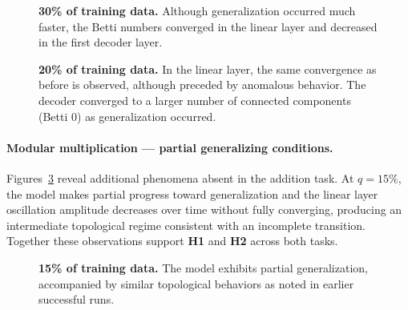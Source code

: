 \begin{figure}[htbp]
    \centering
    \hfill
    
    \caption[30\% of training data (Modular Product).]{\textbf{30\% of training data.} Although generalization occurred much faster, the Betti numbers converged in the linear layer and decreased in the first decoder layer.}
    \label{fig:prod-decoder0-linear-30pct}
\end{figure}

\begin{figure}[htbp]
    \centering
    \hfill
    
    \caption[20\% of training data (Modular Product).]{\textbf{20\% of training data.} In the linear layer, the same convergence as before is observed, although preceded by anomalous behavior. The decoder converged to a larger number of connected components (Betti 0) as generalization occurred.}
    \label{fig:prod-decoder0-linear-20pct}
\end{figure}

\paragraph{Modular multiplication — partial generalizing conditions.}
Figures~\ref{fig:prod-decoder0-linear-15pct}  reveal additional phenomena absent in the addition task. At $q = 15\%$, the model makes partial progress toward generalization and the linear layer oscillation amplitude decreases over time without fully converging, producing an intermediate topological regime consistent with an incomplete transition. Together these observations support \textbf{H1} and \textbf{H2} across both tasks.

\begin{figure}[htbp]
    \centering
    \hfill
    
    \caption[15\% of training data (Modular Product).]{\textbf{15\% of training data.} The model exhibits partial generalization, accompanied by similar topological behaviors as noted in earlier successful runs.}
    \label{fig:prod-decoder0-linear-15pct}
\end{figure}



